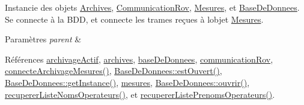 Instancie des objets \hyperlink{class_archives}{Archives}, \hyperlink{class_communication_rov}{Communication\+Rov}, \hyperlink{class_mesures}{Mesures}, et \hyperlink{class_base_de_donnees}{Base\+De\+Donnees}. Se connecte à la B\+DD, et connecte les trames reçues à l\textquotesingle{}objet \hyperlink{class_mesures}{Mesures}.


\begin{DoxyParams}{Paramètres}
{\em parent} & \\
\hline
\end{DoxyParams}


Références \hyperlink{class_rov_a659da5fe3636356b006a8e08a8433dd3}{archivage\+Actif}, \hyperlink{class_rov_ad41ed46f169f28da226a979f70c4d8a4}{archives}, \hyperlink{class_rov_a5a9a824cd100947c75d0951eb9e1f90c}{base\+De\+Donnees}, \hyperlink{class_rov_a8e7aaa17ee2134f26d57241d11ab2a99}{communication\+Rov}, \hyperlink{class_rov_a738965ca84678b506b3d6a326c48e9e3}{connecte\+Archivage\+Mesures()}, \hyperlink{class_base_de_donnees_af9ac332082ffd0dd35e412cefabe5e9c}{Base\+De\+Donnees\+::est\+Ouvert()}, \hyperlink{class_base_de_donnees_a80028aa2b6b4fbf30fb2e36357b7d3d3}{Base\+De\+Donnees\+::get\+Instance()}, \hyperlink{class_rov_af37589b38493e4bd99702587db2d28a8}{mesures}, \hyperlink{class_base_de_donnees_a7f6a5510b08017b0d99115a84252f186}{Base\+De\+Donnees\+::ouvrir()}, \hyperlink{class_rov_a490eefb90bf28e83f181d770f0f52446}{recuperer\+Liste\+Noms\+Operateurs()}, et \hyperlink{class_rov_a84dece742f5c4c903ada4f25c869597f}{recuperer\+Liste\+Prenoms\+Operateurs()}.


